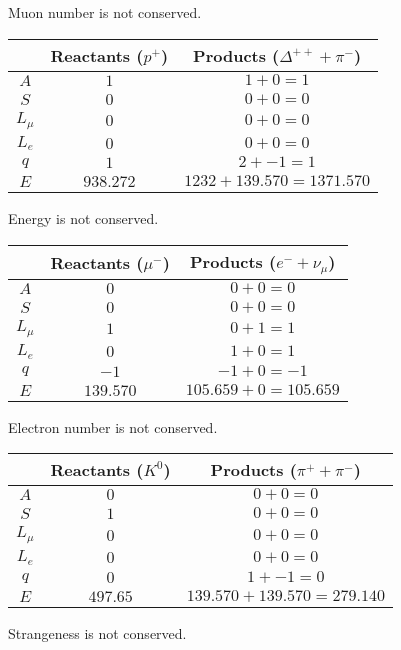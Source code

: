 \documentclass{article}
\begin{document}
Muon number is not conserved.
\begin{center}
\begin{tabular}{|c|c|c|}
    \hline
    & Reactants ($p^{+}$) & Products ($\Delta^{++} + \pi^{-}$) \\
    \hline
    $A$ & $1$ & $1 + 0 = 1$ \\
    \hline
    $S$ & $0$ & $0 + 0 = 0$ \\
    \hline
    $L_{\mu}$ & $0$ & $0 + 0 = 0$ \\
    \hline
    $L_{e}$ & $0$ & $0 + 0 = 0$ \\
    \hline
    $q$ & $1$ & $2 + -1 = 1$ \\
    \hline
    $E$ & $938.272$ & $1232 + 139.570 = 1371.570$\\
    \hline
\end{tabular}
\end{center}
Energy is not conserved.
\begin{center}
\begin{tabular}{|c|c|c|}
    \hline
    & Reactants ($\mu^{-}$) & Products ($e^{-} + \nu_{\mu}$) \\
    \hline
    $A$ & $0$ & $0 + 0 = 0$ \\
    \hline
    $S$ & $0$ & $0 + 0 = 0$ \\
    \hline
    $L_{\mu}$ & $1$ & $0 + 1 = 1$ \\
    \hline
    $L_{e}$ & $0$ & $1 + 0 = 1$ \\
    \hline
    $q$ & $-1$ & $-1 + 0 = -1$ \\
    \hline
    $E$ & $139.570$ & $105.659 + 0 = 105.659$\\
    \hline
\end{tabular}
\end{center}
Electron number is not conserved.
\begin{center}
\begin{tabular}{|c|c|c|}
    \hline
    & Reactants ($K^{0}$) & Products ($\pi^{+} + \pi^{-}$) \\
    \hline
    $A$ & $0$ & $0 + 0 = 0$ \\
    \hline
    $S$ & $1$ & $0 + 0 = 0$ \\
    \hline
    $L_{\mu}$ & $0$ & $0 + 0 = 0$ \\
    \hline
    $L_{e}$ & $0$ & $0 + 0 = 0$ \\
    \hline
    $q$ & $0$ & $1 + -1 = 0$ \\
    \hline
    $E$ & $497.65$ & $139.570 + 139.570 = 279.140$\\
    \hline
\end{tabular}
\end{center}
Strangeness is not conserved.
\clearpage
\end{document}

